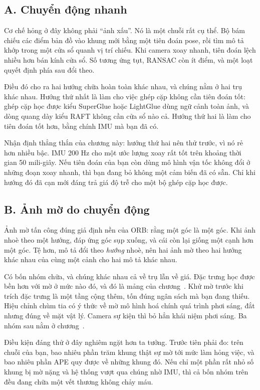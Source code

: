 \documentclass[../../deep_learning.tex]{subfiles}
\begin{document}
\subsection{A. Chuyển động nhanh}
Cơ chế hỏng ở đây không phải ``ảnh xấu''. Nó là một chuỗi rất cụ thể. Bộ bám chiếu các điểm bản đồ vào khung mới bằng một tiên đoán pose, rồi tìm mô tả khớp trong một cửa sổ quanh vị trí chiếu. Khi camera xoay nhanh, tiên đoán lệch nhiều hơn bán kính cửa sổ. Số tương ứng tụt, RANSAC còn ít điểm, và một loạt quyết định phía sau đổi theo.

Điều đó cho ra hai hướng chữa hoàn toàn khác nhau, và chúng nằm ở hai trụ khác nhau. Hướng thứ nhất là làm cho việc ghép cặp không cần tiên đoán tốt: ghép cặp học được kiểu SuperGlue hoặc LightGlue dùng ngữ cảnh toàn ảnh, và dòng quang dày kiểu RAFT \cite{teed2020raft} không cần cửa sổ nào cả. Hướng thứ hai là làm cho tiên đoán tốt hơn, bằng chính IMU mà bạn đã có.

Nhận định thẳng thắn của chương này: hướng thứ hai nên thử trước, vì nó rẻ hơn nhiều bậc. IMU 200 Hz cho một ước lượng xoay rất tốt trên khoảng thời gian 50 mili-giây. Nếu tiên đoán của bạn còn dùng mô hình vận tốc không đổi ở những đoạn xoay nhanh, thì bạn đang bỏ không một cảm biến đã có sẵn. Chỉ khi hướng đó đã cạn mới đáng trả giá độ trễ cho một bộ ghép cặp học được.

\subsection{B. Ảnh mờ do chuyển động}
Ảnh mờ tấn công đúng giả định nền của ORB: rằng một góc là một góc. Khi ảnh nhoè theo một hướng, đáp ứng góc sụp xuống, và cái còn lại giống một cạnh hơn một góc. Tệ hơn, mô tả đổi theo \emph{hướng} nhoè, nên hai ảnh mờ theo hai hướng khác nhau của cùng một cảnh cho hai mô tả khác nhau.

Có bốn nhóm chữa, và chúng khác nhau cả về trụ lẫn về giá. Đặc trưng học được bền hơn với mờ ở mức nào đó, và đó là mảng của chương~. Khử mờ trước khi trích đặc trưng là một tầng cộng thêm, tốn đúng ngân sách mà bạn đang thiếu. Hiệu chỉnh chùm tia có ý thức về mờ mô hình hoá chính quá trình phơi sáng, đắt nhưng đúng về mặt vật lý. Camera sự kiện thì bỏ hẳn khái niệm phơi sáng. Ba nhóm sau nằm ở chương~.

Điều kiện đáng thử ở đây nghiêm ngặt hơn ta tưởng. Trước tiên phải đo: trên chuỗi của bạn, bao nhiêu phần trăm khung thật sự mờ tới mức làm hỏng việc, và bao nhiêu phần APE quy được về những khung đó. Nếu chỉ một phần rất nhỏ số khung bị mờ nặng và hệ thống vượt qua chúng nhờ IMU, thì cả bốn nhóm trên đều đang chữa một vết thương không chảy máu.
\end{document}
